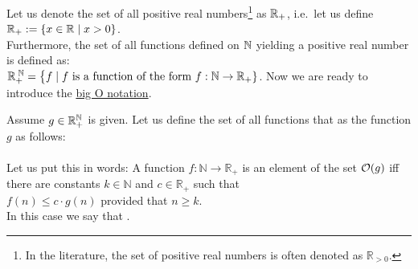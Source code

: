 Let us denote the set of all positive real numbers\footnote{
  In the literature, the set of positive real numbers is often denoted as $\mathbb{R}_{>0}$.}
as ${\mathbb R}_+$, i.e.~let us define 
\\[0.2cm]
\hspace*{1.3cm}
${\mathbb R}_+ := \{ x \in {\mathbb R} \mid x > 0 \}$. 
\\[0.2cm]
Furthermore, the set of all functions defined on  ${\mathbb N}$ yielding a positive real number is defined
as: 
\\[0.2cm]
\hspace*{1.3cm} 
${\mathbb R}_+^{\;{\mathbb N}} = \bigl\{ f \mid \mbox{$f$ is a function of the form $f: {\mathbb N} \rightarrow {\mathbb R}_+$} \}$. 
Now we are ready to introduce the \href{https://en.wikipedia.org/wiki/Big_O_notation}{big O notation}.

\begin{Definition}[$\Oh(g)$] 
Assume $g \in {\mathbb R}_+^{{\mathbb N}}$ is given.   Let us define the set of all functions that 
  as the function $g$ as follows: 
  \\[0.2cm]
  \hspace*{0.5cm} 
  \colorbox{red}{}
  \\[0.2cm]
  Let us put this in words: A function $f:\mathbb{N} \rightarrow \mathbb{R}_+$ is an element of the set
  $\Oh(g)$ iff there are constants $k \in \mathbb{N}$ and $c \in \mathbb{R}_+$ such that
  \\[0.2cm]
  \hspace*{1.3cm}
  $f(n) \leq c \cdot g(n)$ \quad provided that $n \geq k$.
  \\[0.2cm]
  In this case we say that .
  \eox
\end{Definition}

